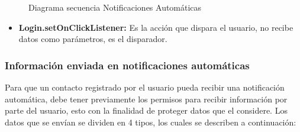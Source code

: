 \begin{figure}[htbp!]
	\centering
	\caption{Diagrama secuencia Notificaciones Automáticas}
	\label{fig:NotificaAuto}
\end{figure}
\begin{itemize}
	\item \textbf{Login.setOnClickListener:} Es la acción que dispara el usuario, no recibe datos como parámetros, es el disparador.
\end{itemize}

\subsubsection{Información enviada en notificaciones automáticas}

Para que un contacto registrado por el usuario pueda recibir una notificación automática, debe tener previamente los permisos para recibir información por parte del usuario, esto con la finalidad de proteger datos que el considere. Los datos que se envían se dividen en 4 tipos, los cuales se describen a continuación:

